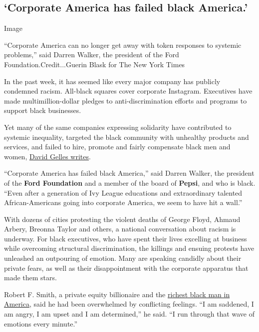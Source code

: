 \hypertarget{corporate-america-has-failed-black-america}{%
\subsection{`Corporate America has failed black
America.'}\label{corporate-america-has-failed-black-america}}

Image

``Corporate America can no longer get away with token responses to
systemic problems,'' said Darren Walker, the president of the Ford
Foundation.Credit...Guerin Blask for The New York Times

In the past week, it has seemed like every major company has publicly
condemned racism. All-black squares cover corporate Instagram.
Executives have made multimillion-dollar pledges to anti-discrimination
efforts and programs to support black businesses.

Yet many of the same companies expressing solidarity have contributed to
systemic inequality, targeted the black community with unhealthy
products and services, and failed to hire, promote and fairly compensate
black men and women,
\href{https://www.nytimes3xbfgragh.onion/2020/06/06/business/corporate-america-has-failed-black-america.html}{David
Gelles writes}.

``Corporate America has failed black America,'' said Darren Walker, the
president of the \textbf{Ford Foundation} and a member of the board of
\textbf{Pepsi}, and who is black. ``Even after a generation of Ivy
League educations and extraordinary talented African-Americans going
into corporate America, we seem to have hit a wall.''

With dozens of cities protesting the violent deaths of George Floyd,
Ahmaud Arbery, Breonna Taylor and others, a national conversation about
racism is underway. For black executives, who have spent their lives
excelling at business while overcoming structural discrimination, the
killings and ensuing protests have unleashed an outpouring of emotion.
Many are speaking candidly about their private fears, as well as their
disappointment with the corporate apparatus that made them stars.

Robert F. Smith, a private equity billionaire and the
\href{https://www.nytimes3xbfgragh.onion/2019/05/19/business/robert-f-smith-morehouse-vista-equity.html}{richest
black man in America}, said he had been overwhelmed by conflicting
feelings. ``I am saddened, I am angry, I am upset and I am determined,''
he said. ``I run through that wave of emotions every minute.''

